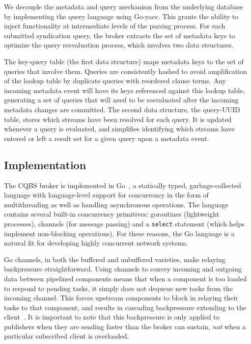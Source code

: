 We decouple the metadata and query mechanism from the underlying database by implementing the query language using Go-yacc.
This grants the ability to inject functionality at intermediate levels of the parsing process.
For each submitted syndication query, the broker extracts the set of metadata keys to optimize the query reevaluation process, which involves two data structures.

The key-query table (the first data structure) maps metadata keys to the set of queries that involve them.
Queries are consistently hashed to avoid amplification of the lookup table by duplicate queries with reordered clause terms.
Any incoming metadata event will have its keys referenced against this lookup table, generating a set of queries that will need to be reevaluated after the incoming metadata changes are committed.
The second data structure, the query-UUID table, stores which streams have been resolved for each query.
It is updated whenever a query is evaluated, and simplifies identifying which streams have entered or left a result set for a given query upon a metadata event.

\subsection{Implementation}

The CQBS broker is implemented in Go~\cite{go}, a statically typed, garbage-collected language with language-level support for concurrency in the
form of multithreading as well as handling asynchronous operations.
The language contains several built-in concurrency primitives: goroutines (lightweight processes), channels (for message passing) and a \texttt{select} statement (which helps implement non-blocking operations).
For these reasons, the Go language is a natural fit for developing highly concurrent network systems.

Go channels, in both the buffered and unbuffered varieties, make relaying backpressure straightforward.
Using channels to convey incoming and outgoing data between pipelined components means that when a component is too loaded to respond to pending tasks, it simply does not dequeue new tasks from the incoming channel.
This forces upstream components to block in relaying their tasks to that component, and results in cascading backpressure extending to the client~\cite{welsh2001seda}.
It is important to note that this backpressure is only applied to publishers when they are sending faster than the broker can sustain, \emph{not} when a particular subscribed client is overloaded.

